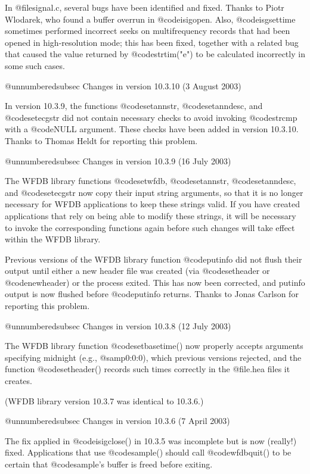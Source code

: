 {{{{{{{{In @file{signal.c}, several bugs have been identified and fixed.  Thanks
to Piotr Wlodarek, who found a buffer overrun in @code{isigopen}.  Also,
@code{isgsettime} sometimes performed incorrect seeks on multifrequency
records that had been opened in high-resolution mode;  this has been
fixed, together with a related bug that caused the value returned by
@code{strtim("e")} to be calculated incorrectly in some such cases.

@unnumberedsubsec Changes in version 10.3.10 (3 August 2003)

In version 10.3.9, the functions @code{setannstr}, @code{setanndesc},
and @code{setecgstr} did not contain necessary checks to avoid invoking
@code{strcmp} with a @code{NULL} argument.  These checks have been added in
version 10.3.10.  Thanks to Thomas Heldt for reporting this problem.

@unnumberedsubsec Changes in version 10.3.9 (16 July 2003)

The WFDB library functions @code{setwfdb}, @code{setannstr},
@code{setanndesc}, and @code{setecgstr} now copy their input string
arguments, so that it is no longer necessary for WFDB applications to
keep these strings valid.  If you have created applications that rely on
being able to modify these strings, it will be necessary to invoke the
corresponding functions again before such changes will take effect
within the WFDB library.

Previous versions of the WFDB library function @code{putinfo} did not
flush their output until either a new header file was created (via
@code{setheader} or @code{newheader}) or the process exited.  This has
now been corrected, and putinfo output is now flushed before
@code{putinfo} returns.  Thanks to Jonas Carlson for reporting this
problem.

@unnumberedsubsec Changes in version 10.3.8 (12 July 2003)

The WFDB library function @code{setbasetime()} now properly
accepts arguments specifying midnight (e.g., @samp{0:0:0}), which previous
versions rejected, and the function @code{setheader()}
records such times correctly in the @file{.hea} files it creates.

(WFDB library version 10.3.7 was identical to 10.3.6.)

@unnumberedsubsec Changes in version 10.3.6 (7 April 2003)

The fix applied in @code{isigclose()} in 10.3.5 was incomplete but is now
(really!) fixed.  Applications that use @code{sample()} should call 
@code{wfdbquit()} to be certain that @code{sample}'s buffer is freed before
exiting.

}}}}}}}}
